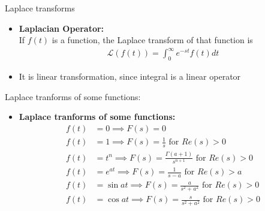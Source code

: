\documentclass{beamer}
\providecommand{\brak}[1]{\ensuremath{\left(#1\right)}}
\theoremstyle{remark}
\numberwithin{equation}{section}
\begin{document}
\begin{frame}{Laplace transforms}
    \begin{itemize}
    \item\textbf{Laplacian Operator:}\\
         If $f\brak{t}$ is a function, the Laplace transform of that function is
        \begin{align}
            \mathcal{L}\brak{f\brak{t}} = \int_0^{\infty}{e^{-st}f\brak{t}}dt \label{lap}
        \end{align}
        \item It is linear transformation, since integral is a linear operator 
        \end{itemize}
\end{frame}
\begin{frame}{Laplace tranforms of some functions:}
\begin{itemize}
        \item \textbf{Laplace tranforms of some functions:}
        \begin{align}
            f\brak{t} &= 0 \implies F(s) = 0 \\
        f\brak{t} &= 1 \implies F(s) = \frac{1}{s} \text{ for } Re(s) > 0\\
        f\brak{t} &= t^n \implies F(s) = \frac{\Gamma\brak{a+1}}{s^{n+1}} \text{ for } Re(s) > 0 \\
        f\brak{t} &= e^{at} \implies F(s) = \frac{1}{s-a} \text{ for } Re(s) > a \\
        f\brak{t} &= \sin{at} \implies F(s) = \frac{a}{s^2 + a^2} \text{ for } Re(s) > 0 \\
        f\brak{t} &= \cos{at} \implies F(s) = \frac{s}{s^2 + a^2} \text{ for } Re(s) > 0
        \end{align}
    \end{itemize}
\end{frame}
\end{document}
